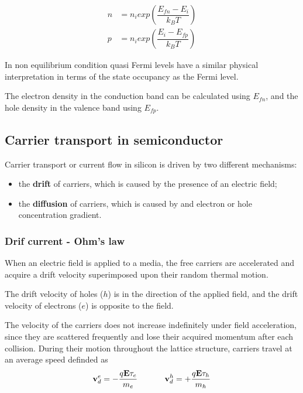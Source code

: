 \begin{align}
n & = n_i exp\left(\dfrac{E_{fn}-E_i}{k_BT}\right) \label{eq: non eq n density mb}\\
p & = n_i exp\left(\dfrac{E_i-E_{fp}}{k_BT}\right)  \label{eq: non eq p density mb}
\end{align}

In non equilibrium condition quasi Fermi levels have a similar physical interpretation in terms of the state occupancy as the Fermi level.
\begin{Osservazione}
The electron density in the conduction band can be calculated using $E_{fn}$, and the hole density in the valence band using $E_{fp}$.
\end{Osservazione}

\subsection{Carrier transport in semiconductor}

Carrier transport or current flow in silicon is driven by two different mechanisms:
\begin{itemize}
\item the \textbf{drift} of carriers, which is caused by the presence of an electric field;
\item the \textbf{diffusion} of carriers, which is caused by and electron or hole concentration gradient.
\end{itemize}

\subsubsection{Drif current - Ohm's law}

When an electric field is applied to a media, the free carriers are accelerated and acquire a drift velocity superimposed upon their random thermal motion.

\begin{Osservazione}
The drift velocity of holes ($h$) is in the direction of the applied field, and the drift velocity of electrons ($e$) is opposite to the field.
\end{Osservazione}

The velocity of the carriers does not increase indefinitely under field acceleration, since they are scattered frequently and lose their acquired momentum after each collision.
During their motion throughout the lattice structure, carriers travel at an average speed definded as
\begin{equation}
\label{eq: velocities}
\vect{v}_d^e = - \dfrac{q\vect{E}\tau_e}{m_e}  \psp{20} 
\vect{v}_d^h = + \dfrac{q\vect{E}\tau_h}{m_h}
\end{equation}

